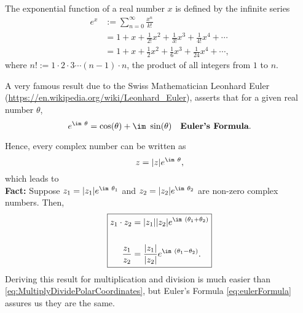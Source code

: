 \vspace*{0.2cm} 
The exponential function of a real number $x$ is defined by the infinite series 
\begin{equation}
    \label{eq:ExponentialFunction}
    \begin{aligned}
   e^x&:= \sum_{n=0}^{\infty}  \frac{x^n}{k !}\\
   & = 1 + x + \frac{1}{2!} x^2 + \frac{1}{3!} x^3 + \frac{1}{4!} x^4 + \cdots\\
   &= 1 + x + \frac{1}{2} x^2 + \frac{1}{6} x^3 + \frac{1}{24} x^4 + \cdots,
    \end{aligned}
\end{equation}
where $n!:= 1\cdot 2 \cdot 3 \cdots (n-1) \cdot n$, the product of all integers from $1$ to $n$. 


\vspace*{2cm}
\begin{tcolorbox}[title=\textbf{Euler's Formula}]
A very famous result due to the Swiss Mathematician Leonhard Euler (\url{https://en.wikipedia.org/wiki/Leonhard_Euler}), asserts that for a given real number $\theta$,
\begin{equation}
    \label{eq:eulerFormula}
e^{\im~\theta}= \cos(\theta) + \im~ \sin(\theta)~~~\textbf{Euler's Formula}.
\end{equation}

Hence, every complex number can be written as 
\begin{equation}
    \label{eq:ComplexEulerCoordinate}
z = |z| e^{\im~\theta},
\end{equation}
which leads to\\

\textbf{Fact:} Suppose $z_1 = |z_1| e^{\im~\theta_1}$ and $z_2 = |z_2| e^{\im~\theta_2}$ are non-zero complex numbers. Then, 
\begin{equation}
    \label{eq:MultiplyDivideEulerCoordinates}
   \boxed{\begin{aligned}
    z_1 \cdot z_2&= |z_1| |z_2| e^{\im~(\theta_1 + \theta_2)}\\
    \\
    \frac{z_1}{z_2}&= \frac{|z_1|}{|z_2|}  e^{\im~(\theta_1 - \theta_2)}. 
    \end{aligned}}
\end{equation}
Deriving this result for multiplication and division is much easier than \eqref{eq:MultiplyDividePolarCoordinates}, but Euler's Formula \eqref{eq:eulerFormula} assures us they are the same.
\end{tcolorbox}

